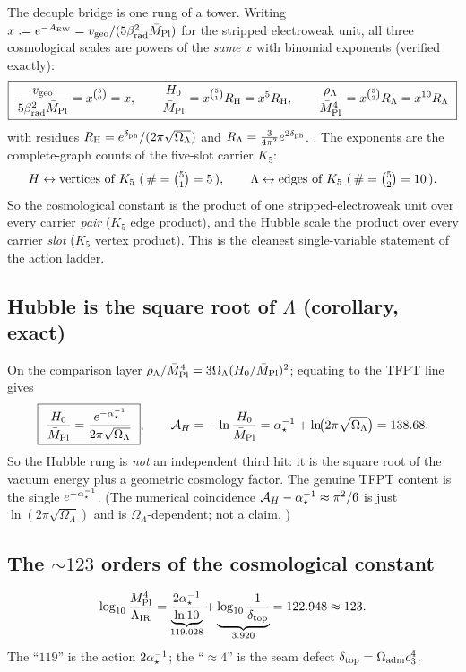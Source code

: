 The decuple bridge is one rung of a tower. Writing $x:=e^{-A_{\mathrm{EW}}}=v_{\mathrm{geo}}/(5\beta_{\mathrm{rad}}^2\bar M_{\mathrm{Pl}})$
for the stripped electroweak unit, all three cosmological scales are powers of the \emph{same} $x$
with binomial exponents (verified exactly):
\begin{equation}
  \boxed{\ \frac{v_{\mathrm{geo}}}{5\betarad^2\Mbar}=x^{\binom50}=x,\qquad
  \frac{H_0}{\Mbar}=x^{\binom51}R_{\mathrm H}=x^5R_{\mathrm H},\qquad
  \frac{\rho_\Lambda}{\Mbar^4}=x^{\binom52}R_\Lambda=x^{10}R_\Lambda\ }
\end{equation}
with residues $R_{\mathrm H}=e^{\delta_{\mathrm{ph}}}/(2\pi\sqrt{\Omega_\Lambda})$ and $R_\Lambda=\tfrac{3}{4\pi^2}e^{2\delta_{\mathrm{ph}}}$.
\mE. The exponents are the complete-graph counts of the five-slot carrier $K_5$:
\[
  H \leftrightarrow \text{vertices of }K_5\ (\,\#=\tbinom51=5\,),\qquad
  \Lambda \leftrightarrow \text{edges of }K_5\ (\,\#=\tbinom52=10\,).
\]
So the cosmological constant is the product of one stripped-electroweak unit over every carrier
\emph{pair} ($K_5$ edge product), and the Hubble scale the product over every carrier \emph{slot}
($K_5$ vertex product). This is the cleanest single-variable statement of the action ladder.

\subsection{Hubble is the square root of $\Lambda$ (corollary, exact)}

On the comparison layer $\rho_\Lambda/\bar M_{\mathrm{Pl}}^4=3\Omega_\Lambda(H_0/\bar M_{\mathrm{Pl}})^2$; equating to the TFPT
line gives
\begin{equation}
  \boxed{\ \frac{H_0}{\Mbar}=\frac{e^{-\ainv}}{2\pi\sqrt{\Omega_\Lambda}}\ },\qquad
  \AH=-\ln\frac{H_0}{\Mbar}=\ainv+\ln\!\bigl(2\pi\sqrt{\Omega_\Lambda}\bigr)=138.68 .
\end{equation}
So the Hubble rung is \emph{not} an independent third hit: it is the square root of the vacuum
energy plus a geometric cosmology factor. The genuine TFPT content is the single $e^{-\alpha^{-1}_\star}$.
(The numerical coincidence $\mathcal A_H-\alpha^{-1}_\star\approx\pi^2/6$ is just $\ln(2\pi\sqrt{\Omega_\Lambda})$ and is
$\Omega_\Lambda$-dependent; not a claim. \mO)

\subsection{The $\sim123$ orders of the cosmological constant}
\begin{equation}
  \log_{10}\frac{M_{\mathrm{Pl}}^4}{\Lambda_{\mathrm{IR}}}
  =\underbrace{\frac{2\alpha^{-1}_\star}{\ln10}}_{119.028}+\underbrace{\log_{10}\frac{1}{\delta_{\mathrm{top}}}}_{3.920}
  =122.948\approx123 .
\end{equation}
The ``$119$'' is the action $2\alpha^{-1}_\star$; the ``$\approx4$'' is the seam defect $\delta_{\mathrm{top}}=\Omega_{\mathrm{adm}}c_3^4$.

